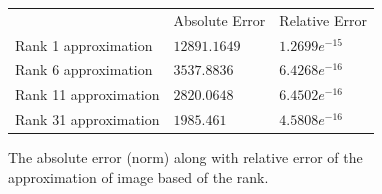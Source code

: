 \begin{figure}[tbh]
 \centering    
\begin{tabular}{ |p{5cm}|| p{3cm}|p{3cm}|}
 \hline
 & Absolute Error &  Relative Error \\ \hhline{|=|=|=|}
 \hline
 Rank 1 approximation  & $12891.1649$ & $1.2699e^{-15}$    \\
 Rank 6 approximation  & $3537.8836$  & $6.4268e^{-16}$   \\
 Rank 11 approximation & $2820.0648$  & $6.4502e^{-16}$   \\
 Rank 31 approximation & $1985.461 $  & $4.5808e^{-16}$   \\
 \hline
\end{tabular} 
\caption{The absolute error (norm) along with relative error of the approximation of  image based of the rank.}
   \label{tab:error}
\end{figure} 